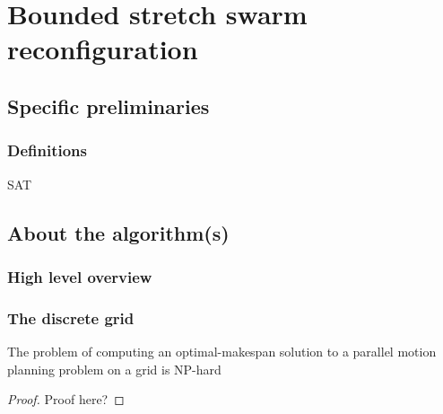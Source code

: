\section{Bounded stretch swarm reconfiguration}

\subsection{Specific preliminaries}

\subsubsection{Definitions}

\begin{definition}
    SAT
\end{definition}

\subsection{About the algorithm(s)}

\subsubsection{High level overview}

\cite{siamcomp/DemaineFKMS19} 


\subsubsection{The discrete grid} 

\begin{theorem}
    The problem of computing an optimal-makespan solution to a parallel motion planning problem on a grid is NP-hard
\end{theorem}

\begin{proof}
    Proof here?
\end{proof}

